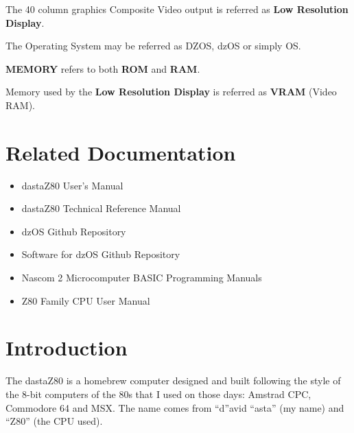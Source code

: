 \documentclass[a4paper,11pt]{article}
\begin{document}
    The 40 column graphics Composite Video output is referred as \textbf{Low
    Resolution Display}.
    
    The Operating System may be referred as DZOS, dzOS or simply OS.

    \textbf{MEMORY} refers to both \textbf{ROM} and \textbf{RAM}.

    Memory used by the \textbf{Low Resolution Display} is referred as
    \textbf{VRAM} (Video RAM).

    \pagebreak
    \section*{Related Documentation}
    \begin{itemize}
        \item dastaZ80 User's Manual\cite{dastaz80userman}
        \item dastaZ80 Technical Reference Manual\cite{dastaz80techman}
        \item dzOS Github Repository\cite{dastaZ80github}
        \item Software for dzOS Github Repository\cite{dastaZ80githubsoft}
        \item Nascom 2 Microcomputer BASIC Programming Manuals\cite{nascombasic}
        \item Z80 Family CPU User Manual\cite{z80manual}
    \end{itemize}

    \pagebreak
    \tableofcontents

    \pagebreak
    \pagestyle{fancy}
    \fancyhf{}
    \fancyfoot[R]{\thepage}
    \setcounter{page}{1}
    \section{Introduction}
    The dastaZ80 is a homebrew computer designed and built following the style
    of the 8-bit computers of the 80s that I used on those days: Amstrad CPC,
    Commodore 64 and MSX. The name comes from “d”avid “asta” (my name) and 
    “Z80” (the CPU used).
\end{document}

